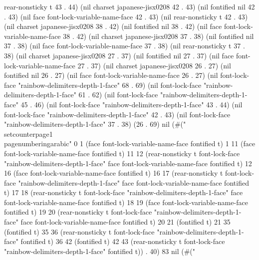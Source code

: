 rear-nonsticky t 43 . 44) (nil charset japanese-jisx0208 42 . 43) (nil fontified nil 42 . 43) (nil face font-lock-variable-name-face 42 . 43) (nil rear-nonsticky t 42 . 43) (nil charset japanese-jisx0208 38 . 42) (nil fontified nil 38 . 42) (nil face font-lock-variable-name-face 38 . 42) (nil charset japanese-jisx0208 37 . 38) (nil fontified nil 37 . 38) (nil face font-lock-variable-name-face 37 . 38) (nil rear-nonsticky t 37 . 38) (nil charset japanese-jisx0208 27 . 37) (nil fontified nil 27 . 37) (nil face font-lock-variable-name-face 27 . 37) (nil charset japanese-jisx0208 26 . 27) (nil fontified nil 26 . 27) (nil face font-lock-variable-name-face 26 . 27) (nil font-lock-face "rainbow-delimiters-depth-1-face" 68 . 69) (nil font-lock-face "rainbow-delimiters-depth-1-face" 61 . 62) (nil font-lock-face "rainbow-delimiters-depth-1-face" 45 . 46) (nil font-lock-face "rainbow-delimiters-depth-1-face" 43 . 44) (nil font-lock-face "rainbow-delimiters-depth-1-face" 42 . 43) (nil font-lock-face "rainbow-delimiters-depth-1-face" 37 . 38) (26 . 69) nil (#("\\setcounter{page}{1}
\\pagenumbering{arabic}" 0 1 (face font-lock-variable-name-face fontified t) 1 11 (face font-lock-variable-name-face fontified t) 11 12 (rear-nonsticky t font-lock-face "rainbow-delimiters-depth-1-face" face font-lock-variable-name-face fontified t) 12 16 (face font-lock-variable-name-face fontified t) 16 17 (rear-nonsticky t font-lock-face "rainbow-delimiters-depth-1-face" face font-lock-variable-name-face fontified t) 17 18 (rear-nonsticky t font-lock-face "rainbow-delimiters-depth-1-face" face font-lock-variable-name-face fontified t) 18 19 (face font-lock-variable-name-face fontified t) 19 20 (rear-nonsticky t font-lock-face "rainbow-delimiters-depth-1-face" face font-lock-variable-name-face fontified t) 20 21 (fontified t) 21 35 (fontified t) 35 36 (rear-nonsticky t font-lock-face "rainbow-delimiters-depth-1-face" fontified t) 36 42 (fontified t) 42 43 (rear-nonsticky t font-lock-face "rainbow-delimiters-depth-1-face" fontified t)) . 40) 83 nil (#("%
